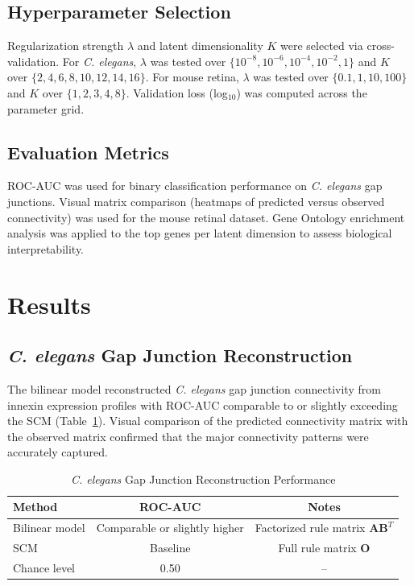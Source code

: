 \documentclass[11pt]{article}
\begin{document}
\subsection{Hyperparameter Selection}

Regularization strength $\lambda$ and latent dimensionality $K$ were selected via cross-validation. For \textit{C. elegans}, $\lambda$ was tested over $\{10^{-8}, 10^{-6}, 10^{-4}, 10^{-2}, 1\}$ and $K$ over $\{2, 4, 6, 8, 10, 12, 14, 16\}$. For mouse retina, $\lambda$ was tested over $\{0.1, 1, 10, 100\}$ and $K$ over $\{1, 2, 3, 4, 8\}$. Validation loss (log$_{10}$) was computed across the parameter grid.

\subsection{Evaluation Metrics}

ROC-AUC was used for binary classification performance on \textit{C. elegans} gap junctions. Visual matrix comparison (heatmaps of predicted versus observed connectivity) was used for the mouse retinal dataset. Gene Ontology enrichment analysis was applied to the top genes per latent dimension to assess biological interpretability.

\section{Results}

\subsection{\textit{C. elegans} Gap Junction Reconstruction}

The bilinear model reconstructed \textit{C. elegans} gap junction connectivity from innexin expression profiles with ROC-AUC comparable to or slightly exceeding the SCM (Table~\ref{tab:celegans}). Visual comparison of the predicted connectivity matrix with the observed matrix confirmed that the major connectivity patterns were accurately captured.

\begin{table}[ht]
\centering
\caption{\textit{C. elegans} Gap Junction Reconstruction Performance}
\label{tab:celegans}
\begin{tabular}{lcc}
\toprule
\textbf{Method} & \textbf{ROC-AUC} & \textbf{Notes} \\
\midrule
Bilinear model & Comparable or slightly higher & Factorized rule matrix $\mathbf{AB}^T$ \\
SCM & Baseline & Full rule matrix $\mathbf{O}$ \\
Chance level & 0.50 & -- \\
\bottomrule
\end{tabular}
\end{table}
\end{document}
